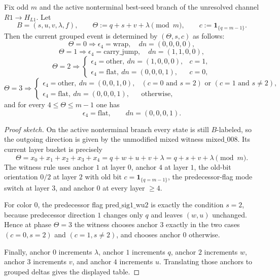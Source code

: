\begin{theorem}\label{thm:d5-active-phase-scheduler}
Fix odd $m$ and the active nonterminal best-seed branch of the unresolved channel $R1\to H_{L1}$. Let
\[
B=(s,u,v,\lambda,f),\qquad
\Theta:=q+s+v+\lambda\pmod m,
\qquad c:=\mathbf 1_{\{q=m-1\}}.
\]
Then the current grouped event is determined by $(\Theta,s,c)$ as follows:
\[
\Theta=0 \Rightarrow \epsilon_4=\mathrm{wrap},\quad dn=(0,0,0,0),
\]
\[
\Theta=1 \Rightarrow \epsilon_4=\mathrm{carry\_jump},\quad dn=(1,1,0,0),
\]
\[
\Theta=2 \Rightarrow
\begin{cases}
\epsilon_4=\mathrm{other},\ dn=(1,0,0,0),& c=1,\\
\epsilon_4=\mathrm{flat},\ dn=(0,0,0,1),& c=0,
\end{cases}
\]
\[
\Theta=3 \Rightarrow
\begin{cases}
\epsilon_4=\mathrm{other},\ dn=(0,0,1,0),& (c=0 \text{ and } s=2) \text{ or } (c=1 \text{ and } s\neq 2),\\
\epsilon_4=\mathrm{flat},\ dn=(0,0,0,1),& \text{otherwise},
\end{cases}
\]
and for every $4\le \Theta\le m-1$ one has
\[
\epsilon_4=\mathrm{flat},\qquad dn=(0,0,0,1).
\]
\end{theorem}

\begin{proof}[Proof sketch]
On the active nonterminal branch every state is still $B$-labeled, so the outgoing direction is given by the unmodified mixed witness $\mathrm{mixed\_008}$. Its current layer bucket is precisely
\[
\Theta=x_0+x_1+x_2+x_3+x_4=q+w+u+v+\lambda=q+s+v+\lambda \pmod m.
\]
The witness rule uses anchor $1$ at layer $0$, anchor $4$ at layer $1$, the old-bit orientation $0/2$ at layer $2$ with old bit $c=\mathbf 1_{\{q=m-1\}}$, the predecessor-flag mode switch at layer $3$, and anchor $0$ at every layer $\ge 4$.

For color $0$, the predecessor flag $\mathrm{pred\_sig1\_wu2}$ is exactly the condition $s=2$, because predecessor direction $1$ changes only $q$ and leaves $(w,u)$ unchanged. Hence at phase $\Theta=3$ the witness chooses anchor $3$ exactly in the two cases $(c=0,s=2)$ and $(c=1,s\neq 2)$, and chooses anchor $0$ otherwise.

Finally, anchor $0$ increments $\lambda$, anchor $1$ increments $q$, anchor $2$ increments $w$, anchor $3$ increments $v$, and anchor $4$ increments $u$. Translating those anchors to grouped deltas gives the displayed table.
\end{proof}

